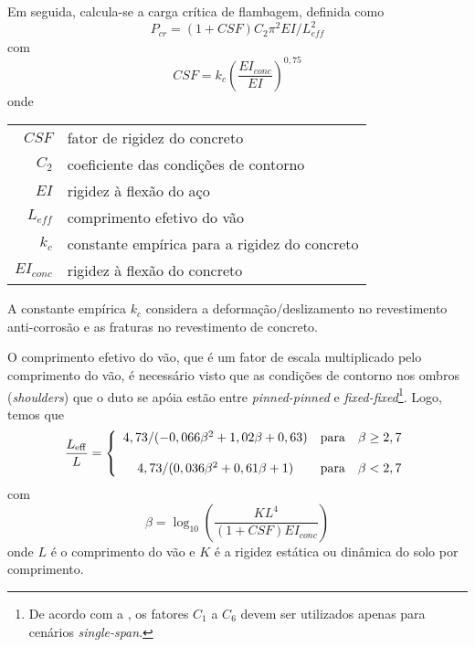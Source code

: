 Em seguida, calcula-se a carga crítica de flambagem, definida como
\begin{equation}
\label{eq:jdsn-Pcr} 
P_\mathit{cr} = (1 + \mathit{CSF}) C_2\pi^2 \mathit{EI}/L_\mathit{eff}^2
\end{equation}
com
\begin{equation}
\label{eq:jdsn-CSF}
\mathit{CSF} = k_c  \left(\frac{\mathit{EI}_\mathit{conc}}{\mathit{EI}}\right)^{0,75}
\end{equation}
onde

\begin{tabular}{rl}
	$\mathit{CSF}$               & fator de rigidez do concreto\\
	$C_2$                        & coeficiente das condições de contorno\\
	$\mathit{EI}$                & rigidez à flexão do aço\\
	$L_\mathit{eff}$             & comprimento efetivo do vão\\
	$k_c$                        & constante empírica para a rigidez do concreto\\
	$\mathit{EI}_\mathit{conc}$  & rigidez à flexão do concreto
\end{tabular}

A constante empírica $k_c$ considera a deformação/deslizamento no revestimento anti-corrosão e as fraturas no revestimento de concreto.

O comprimento efetivo do vão, que é um fator de escala multiplicado pelo comprimento do vão, é necessário visto que as condições de contorno nos ombros (\textit{shoulders}) que o duto se apóia estão entre \textit{pinned-pinned} e \textit{fixed-fixed}\footnote{De acordo com a , os fatores $C_1$ a $C_6$ devem ser utilizados apenas para cenários \textit{single-span}.}. Logo, temos que
\begin{equation}
\label{eq:jdsn-LeffL}
\frac{L_\mathrm{eff}}{L} = 
\left\{
\begin{array}{c c c}  
	4,73 / (-0,066 \beta^2 + 1,02 \beta + 0,63)   & \mathrm{para} & \beta \geq 2,7 \\
	\\
	4,73 / (0,036 \beta^2 + 0,61 \beta + 1)       & \mathrm{para} & \beta <    2,7
\end{array}
\right.
\end{equation}
com
\begin{equation}
\label{eq:jdsn-beta}
\beta = \log_{10}\left( \frac{K L^4}{(1 + \mathit{CSF})\mathit{EI}_\mathit{conc}} \right)
\end{equation}
onde $L$ é o comprimento do vão e $K$ é a rigidez estática ou dinâmica do solo por comprimento.

